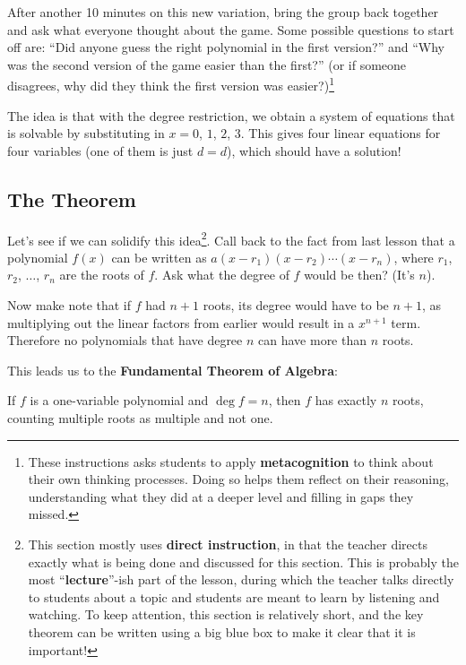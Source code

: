After another 10 minutes on this new variation, bring the group back together and ask what everyone thought about the game. Some possible questions to start off are: ``Did anyone guess the right polynomial in the first version?'' and ``Why was the second version of the game easier than the first?'' (or if someone disagrees, why did they think the first version was easier?)\footnote{These instructions asks students to apply \textbf{metacognition} to think about their own thinking processes. Doing so helps them reflect on their reasoning, understanding what they did at a deeper level and filling in gaps they missed.}

The idea is that with the degree restriction, we obtain a system of equations that is solvable by substituting in $x=0$, $1$, $2$, $3$. This gives four linear equations for four variables (one of them is just $d = d$), which should have a solution!

\subsection{The Theorem}

Let's see if we can solidify this idea\footnote{This section mostly uses \textbf{direct instruction}, in that the teacher directs exactly what is being done and discussed for this section. This is probably the most ``\textbf{lecture}''-ish part of the lesson, during which the teacher talks directly to students about a topic and students are meant to learn by listening and watching. To keep attention, this section is relatively short, and the key theorem can be written using a big blue box to make it clear that it is important!}. Call back to the fact from last lesson that a polynomial $f(x)$ can be written as $a(x-r_1)(x-r_2)\cdots (x-r_n)$, where $r_1$, $r_2$, $\dots$, $r_n$ are the roots of $f$. Ask what the degree of $f$ would be then? (It's $n$). 

Now make note that if $f$ had $n+1$ roots, its degree would have to be $n+1$, as multiplying out the linear factors from earlier would result in a $x^{n+1}$ term. Therefore no polynomials that have degree $n$ can have more than $n$ roots.

This leads us to the \textbf{Fundamental Theorem of Algebra}:
\begin{theorem}
    If $f$ is a one-variable polynomial and $\deg f = n$, then $f$ has exactly $n$ roots, counting multiple roots as multiple and not one.
\end{theorem}

